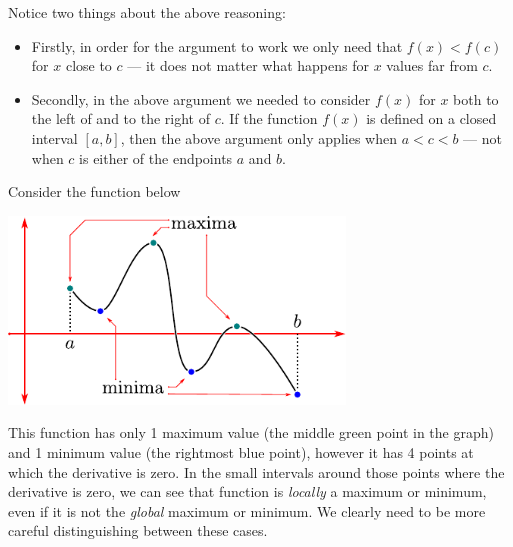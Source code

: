 Notice two things about the above reasoning:
\begin{itemize}
 \item  Firstly, in order for the argument to work we
only need that $f(x)<f(c)$ for $x$ close to $c$ --- it does not matter what happens for
$x$ values far from $c$.
\item Secondly, in the above argument we needed to consider $f(x)$ for $x$ both
to the left of and to the right of $c$. If the function $f(x)$ is defined on a
closed interval $[a,b]$, then the above argument only applies when $a<c<b$ ---
not when $c$ is either of the endpoints $a$ and $b$.

\end{itemize}
Consider the function below
\begin{efig}
 \begin{center}
  \includegraphics[height=5cm]{extra/maxmin}
 \end{center}
\end{efig}
This function has only 1 maximum value (the middle green point in the graph) and
1 minimum value (the rightmost blue point), however it has 4 points at which the
derivative is zero. In the small intervals around those points where the
derivative is zero, we can see that function is \emph{locally} a maximum or
minimum, even if it is not the \emph{global} maximum or minimum. We clearly need
to be more careful distinguishing between these cases.



